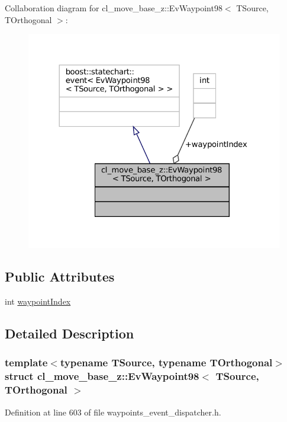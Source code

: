 Collaboration diagram for cl\+\_\+move\+\_\+base\+\_\+z\+:\+:Ev\+Waypoint98$<$ T\+Source, T\+Orthogonal $>$\+:
\nopagebreak
\begin{figure}[H]
\begin{center}
\leavevmode
\includegraphics[width=324pt]{structcl__move__base__z_1_1EvWaypoint98__coll__graph}
\end{center}
\end{figure}
\subsection*{Public Attributes}
\begin{DoxyCompactItemize}
\item 
int \hyperlink{structcl__move__base__z_1_1EvWaypoint98_a8c62e06c9440d7e0e3d306c2279232ea}{waypoint\+Index}
\end{DoxyCompactItemize}


\subsection{Detailed Description}
\subsubsection*{template$<$typename T\+Source, typename T\+Orthogonal$>$\newline
struct cl\+\_\+move\+\_\+base\+\_\+z\+::\+Ev\+Waypoint98$<$ T\+Source, T\+Orthogonal $>$}



Definition at line 603 of file waypoints\+\_\+event\+\_\+dispatcher.\+h.



